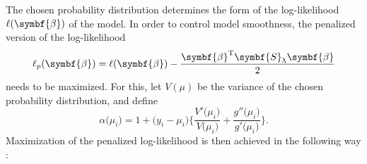 The chosen probability distribution determines the form of the log-likelihood \(\loglikelihood(\symbf{\beta})\) of the model.  In order to control model smoothness, the penalized version of the log-likelihood
\begin{equation}
  \label{eq:SCAMPenalizedLogLikelihood}
  \loglikelihood_p(\symbf{\beta}) = \loglikelihood(\symbf{\beta}) - \frac{\symbf{\beta}^{\text{T}} \symbf{S}_\uplambda \symbf{\beta}}{2}
\end{equation}
needs to be maximized.  For this, let \(V(\mu)\) be the variance of the chosen probability distribution, and define
\begin{equation}
  \label{eq:SCAMVarianceAlpha}
  \alpha \bigl(\mu_i\bigr) = 1 + \bigl(y_i - \mu_i\bigr)\Biggl\{\frac{V'\bigl(\mu_i\bigr)}{V\bigl(\mu_i\bigr)} + \frac{g''\bigl(\mu_i\bigr)}{g'\bigl(\mu_i\bigr)}\Biggr\}.
\end{equation}
Maximization of the penalized log-likelihood is then achieved in the following way \parencite{Pya2015}:
